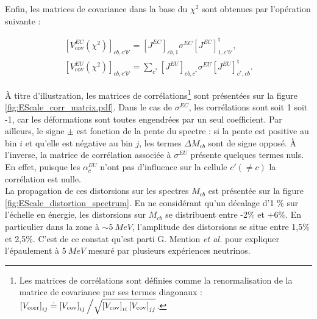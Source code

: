\bigbreak

Enfin, les matrices de covariance dans la base du $\chi^2$ sont obtenues par l'opération suivante :

\begin{equation}
\begin{gathered}
    \left[V_\textrm{cov}^{EC}\left(\chi^2\right)\right]_{cb,c'b'} = \left[J^{EC}\right]_{cb,1} \sigma^{EC} \left[J^{EC}\right]^\textrm{t}_{1,c'b'}, \\
     \left[V_\textrm{cov}^{EU}\left(\chi^2\right)\right]_{cb,c'b'} = \sum_{c^*} \left[J^{EU}\right]_{cb,c^*} \sigma^{EU} \left[J^{EU}\right]^\textrm{t}_{c^*,cb}.
\end{gathered}
\end{equation}

\bigbreak

À titre d'illustration, les matrices de corrélations\footnote{Les matrices de corrélations sont définies comme la renormalisation de la matrice de covariance par ses termes diagonaux : $\left[V_\textrm{corr}\right]_{ij} \doteq \left[V_\textrm{cov}\right]_{ij}\left/\sqrt{\left[V_\textrm{cov}\right]_{ii} \left[V_\textrm{cov}\right]_{jj}}\right.$.} sont présentées sur la figure \ref{fig:EScale_corr_matrix.pdf}. Dans le cas de $\sigma^{EC}$, les corrélations sont soit 1 soit -1, car les déformations sont toutes engendrées par un seul coefficient. Par ailleurs, le signe $\pm$ est fonction de la pente du spectre : si la pente est positive au bin $i$ et qu'elle est négative au bin $j$, les termes $\Delta M_{cb}$ sont de signe opposé. À l'inverse, la matrice de corrélation associée à $\sigma^{EU}$ présente quelques termes nuls. En effet, puisque les $\alpha^{EU}_{c}$ n'ont pas d'influence sur la cellule $c' (\neq c)$ la corrélation est nulle.\\

La propagation de ces distorsions sur les spectres $M_{cb}$ est présentée sur la figure \ref{fig:EScale_distortion_spectrum}. En ne considérant qu'un décalage d'1 \% sur l'échelle en énergie, les distorsions sur $M_{cb}$ se distribuent entre -2\% et +6\%. En particulier dans la zone à $\sim \SI{5}{MeV}$, l'amplitude des distorsions se situe entre 1,5\% et 2,5\%. C'est de ce constat qu'est parti G. Mention \textit{et al.} \cite{Mention:2017dyq} pour expliquer l'épaulement à $\SI{5}{MeV}$ mesuré par plusieurs expériences neutrinos.

%

